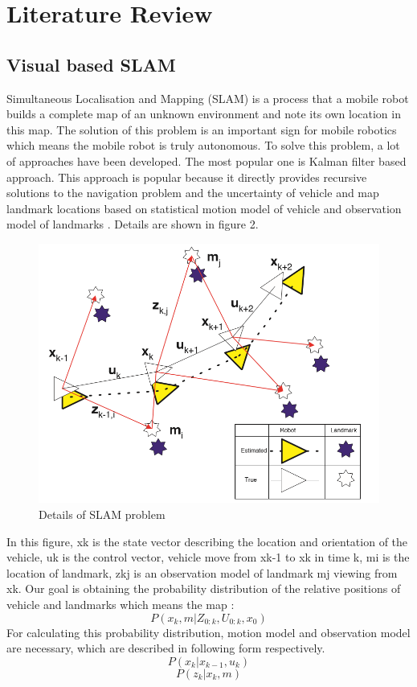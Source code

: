 \documentclass[a4paper,11pt]{article}
\begin{document}
\newpage
\section{Literature Review}
\subsection{Visual based SLAM}
Simultaneous Localisation and Mapping (SLAM) is a process that a mobile robot builds a complete map of an unknown environment and note its own location in this map. The solution of this problem is an important sign for mobile robotics which means the mobile robot is truly autonomous. To solve this problem, a lot of approaches have been developed. The most popular one is Kalman filter based approach. This approach is popular because it directly provides recursive solutions to the navigation problem and the uncertainty of vehicle and map landmark locations based on statistical motion model of vehicle and observation model of landmarks \cite{938381}. Details are shown in figure 2.

\begin{figure}[!htp]


\centering
\includegraphics[width=1\textwidth]{3.png}
\caption{\label{fig:frog}Details of SLAM problem}
\end{figure}
In this figure, xk is the state vector describing the location and orientation of the vehicle, uk is the control vector, vehicle move from xk-1 to xk in time k, mi is the location of landmark, zkj is an observation model of landmark mj viewing from xk. Our goal is obtaining the probability distribution of the relative positions of vehicle and landmarks which means the map \cite{1638022}:
\begin{equation}
P(x_k,m | Z_{0:k}, U_{0:k}, x_0)
\end{equation}
For calculating this probability distribution, motion model and observation model are necessary, which are described in following form respectively.
\begin{equation}
P(x_k | x_{k-1}, u_k)
\end{equation}
\begin{equation}
P(z_k | x_k, m)
\end{equation}
\end{document}
